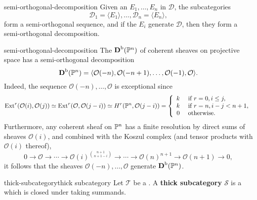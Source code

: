 \begin{example}{semi-orthogonal-decomposition}
    Given an  $E_1, \ldots, E_n$ in $\mathcal{D}$, the subcategories
    \[ \mathcal{D}_1 = \langle E_1 \rangle, \ldots, \mathcal{D}_n = \langle E_n \rangle , \]
    form a semi-orthogonal sequence, and if the $E_i$ generate $\mathcal{D}$, then they form a semi-orthogonal decomposition.
\end{example}

\begin{example}{semi-orthogonal-decomposition}
    The  $\textbf{D}^\textup{b}(\mathbb{P}^n)$ of coherent sheaves on projective space has a semi-orthogonal decomposition
    \[ \textbf{D}^\textup{b}(\mathbb{P}^n) = \langle \mathcal{O}(-n), \mathcal{O}(-n + 1), \ldots, \mathcal{O}(-1), \mathcal{O} \rangle . \]
    Indeed, the sequence $\mathcal{O}(-n), \ldots, \mathcal{O}$ is exceptional since
    \[ \textup{Ext}^r(\mathcal{O}(i), \mathcal{O}(j)) \simeq \textup{Ext}^r(\mathcal{O}, \mathcal{O}(j - i)) \simeq H^r(\mathbb{P}^n, \mathcal{O}(j - i)) = \left\{ \begin{array}{cl}
         k & \textup{ if } r = 0, i \le j , \\
         k & \textup{ if } r = n, i - j < n + 1 , \\
         0 & \textup{ otherwise}.
    \end{array} \right. \]
    Furthermore, any coherent sheaf on $\mathbb{P}^n$ has a finite resolution by direct sums of sheaves $\mathcal{O}(i)$, and combined with the Koszul complex (and tensor products with $\mathcal{O}(i)$ thereof),
    \[ 0 \to \mathcal{O} \to \cdots \to \mathcal{O}(i)^{\binom{n + 1}{n + 1 - i}} \to \cdots \to \mathcal{O}(n)^{n + 1} \to \mathcal{O}(n + 1) \to 0 , \]
    it follows that the sheaves $\mathcal{O}(-n), \ldots, \mathcal{O}$ generate $\textbf{D}^\textup{b}(\mathbb{P}^n)$.
\end{example}

\begin{topic}{thick-subcategory}{thick subcategory}
    Let $\mathcal{T}$ be a . A \textbf{thick subcategory} $\mathcal{S}$ is a   which is closed under taking summands.
\end{topic}

